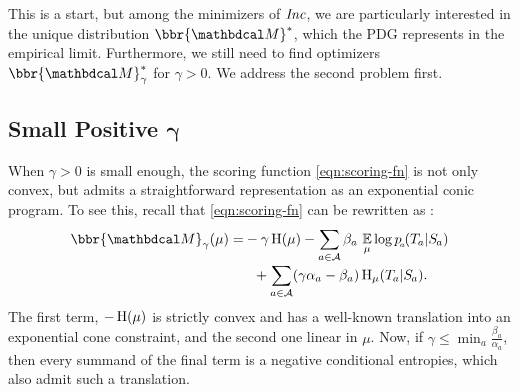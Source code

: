 \documentclass[twoside]{article}
\begin{document}
This is a start, but among the minimizers of $\mathit{Inc}$, we are particularly interested in the unique distribution $\bbr{\dg M}^*$, which the PDG represents in the empirical limit.
Furthermore, we still need to find optimizers $\bbr{\dg M}^*_\gamma$ for $\gamma > 0$.
We address the second problem first. 

\subsection{%
    Small Positive
    \texorpdfstring{$\boldsymbol\gamma$}{gamma}%
} \label{sec:small-gamma}

When $\gamma > 0$ is small enough, 
the scoring function \eqref{eqn:scoring-fn} is not only convex, 
but admits a straightforward representation as an exponential conic program.
To see this, recall that \eqref{eqn:scoring-fn}
 can be rewritten as \parencite[Proposition 4.6]{pdg-aaai}:
\begin{equation}
    \begin{aligned}
        \bbr{\dg M}_\gamma(\mu) = 
        &-\gamma\H(\mu) - 
            \sum_{a \in \Ar}
                \beta_a\, \Ex_\mu 
                    \log {p\ssub a(\Tgt a | \Src a)}
                \\[-0.5ex]
            &~~+ \sum_{a \in \Ar}
            (\gamma \alpha_a - \beta_a)
                \H_\mu (\Tgt a | \Src a).
    \end{aligned}
    \label{eq:altscore}
\end{equation}
The first term, $-\operatorname{\mathrm{H}}(\mu)$ is strictly convex and has a well-known 
translation into an exponential cone constraint, and the second one linear in $\mu$. 
Now, if $\gamma \le \min_{a} \frac{\beta_a}{\alpha_a}$, then every summand of the final term is a negative conditional entropies, which also admit such a translation.
\end{document}
